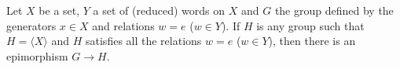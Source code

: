 \begin{theorem}
Let $X$ be a set, $Y$ a set of (reduced) words on $X$ and $G$ the group defined by the generators $x \in X$ and relations $w = e$ ($w \in Y$). If $H$ is any group such that $H = \langle X \rangle$ and $H$ satisfies all the relations $w = e$ ($w \in Y$), then there is an epimorphism $G \rightarrow H$.
\end{theorem}
